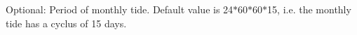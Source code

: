 Optional\+: Period of monthly tide. Default value is 24$\ast$60$\ast$60$\ast$15, i.\+e. the monthly tide has a cyclus of 15 days. 